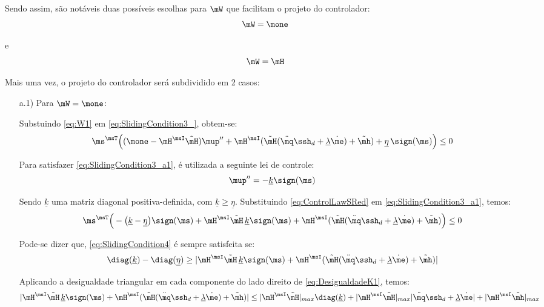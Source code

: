 \documentclass[]{politex}
\begin{document}
\begin{itemize}
Sendo assim, são notáveis duas possíveis escolhas para $\mW$ que facilitam o projeto do controlador:
\begin{equation} \label{eq:W1}
\mW = \mone
\end{equation}

e
\begin{equation} \label{eq:W2}
\mW = \mH
\end{equation}

Mais uma vez, o projeto do controlador será subdividido em 2 casos:

\begin{itemize}
\item[a.1)] Para $\mW = \mone$:


Substuindo \eqref{eq:W1} em \eqref{eq:SlidingCondition3_}, obtem-se:
\begin{equation} \label{eq:SlidingCondition3_a1}
\ms^\msT \Big((\mone - \mH^\msI \tilde{\mH} )\mup'' + \mH^\msI( \tilde{\mH}(\ddot{\mq}\ssh_d + \underline{\lambda} \dot{\me}) + \tilde{\mh} ) + \underline{\eta} \, \sign(\ms) \Big) \leq 0
\end{equation}

Para satisfazer \eqref{eq:SlidingCondition3_a1}, é utilizada a seguinte lei de controle:
\begin{equation} \label{eq:ControlLawSRed}
\mup'' =  -\underline{k} \sign(\ms)
\end{equation}

Sendo $\underline{k}$ uma matriz diagonal positiva-definida, com $\underline{k} \geq \underline{\eta} $. Substituindo \eqref{eq:ControlLawSRed} em \eqref{eq:SlidingCondition3_a1}, temos:
\begin{equation} \label{eq:SlidingCondition4}
\ms^\msT \Big(- \big(\underline{k} - \underline{\eta} \big)  \sign(\ms) + \mH^\msI \tilde{\mH} \, \underline{k} \sign(\ms) + \mH^\msI( \tilde{\mH}(\ddot{\mq}\ssh_d + \underline{\lambda} \dot{\me}) + \tilde{\mh} ) \Big) \leq 0
\end{equation}

Pode-se dizer que, \eqref{eq:SlidingCondition4} \'e sempre satisfeita se:
\begin{equation} \label{eq:DesigualdadeK1}
 \diag(\underline{k}) - \diag(\underline{\eta}) \geq  | \mH^\msI \tilde{\mH} \, \underline{k} \sign(\ms) + \mH^\msI( \tilde{\mH}(\ddot{\mq}\ssh_d + \underline{\lambda} \dot{\me}) + \tilde{\mh} ) |
\end{equation}

Aplicando a desigualdade triangular em cada componente do lado direito de \eqref{eq:DesigualdadeK1}, temos:
\begin{equation}
| \mH^\msI \tilde{\mH} \, \underline{k} \sign(\ms) + \mH^\msI( \tilde{\mH}(\ddot{\mq}\ssh_d + \underline{\lambda} \dot{\me}) + \tilde{\mh} ) | \leq | \mH^\msI \tilde{\mH}|_{max} \diag(\underline{k}) +  |\mH^\msI \tilde{\mH}|_{max} |\ddot{\mq}\ssh_d + \underline{\lambda} \dot{\me}| + |\mH^\msI\tilde{\mh}|_{max}
\end{equation}


\end{itemize}
\end{itemize}
\end{document}
